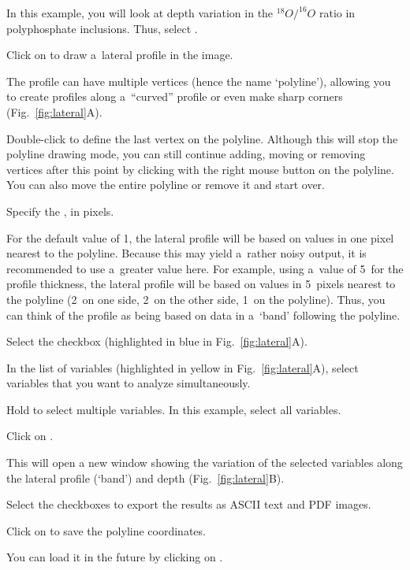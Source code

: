 \bul In this example, you will look at depth variation in the ${}^{18}O/^{16}O$ ratio in polyphosphate inclusions. Thus, select .

\s Click on  to draw a~lateral profile in the image.

\bul The profile can have multiple vertices (hence the name `polyline'), allowing you to create profiles along a~``curved'' profile or even make sharp corners (Fig.~\ref{fig:lateral}A).

\bul Double-click to define the last vertex on the polyline. Although this will stop the polyline drawing mode, you can still continue adding, moving or removing vertices after this point by clicking with the right mouse button on the polyline. You can also move the entire polyline or remove it and start over.

\s Specify the , in pixels.

\bul For the default value of 1, the lateral profile will be based on values in one pixel nearest to the polyline. Because this may yield a~rather noisy output, it is recommended to use a~greater value here. For example, using a~value of 5~for the profile thickness, the lateral profile will be based on values in 5~pixels nearest to the polyline (2~on one side, 2~on the other side, 1~on the polyline). Thus, you can think of the profile as being based on data in a~`band' following the polyline.

\s Select the  checkbox (highlighted in blue in Fig.~\ref{fig:lateral}A).

\s In the list of variables (highlighted in yellow in Fig.~\ref{fig:lateral}A), select variables that you want to analyze simultaneously.

\bul Hold  to select multiple variables. In this example, select all variables.

\s Click on .

\bul This will open a new window showing the variation of the selected variables along the lateral profile (`band') and depth (Fig.~\ref{fig:lateral}B).

\s Select the  checkboxes to export the results as ASCII text and PDF images.

\s Click on  to save the polyline coordinates.

\bul You can load it in the future by clicking on .

